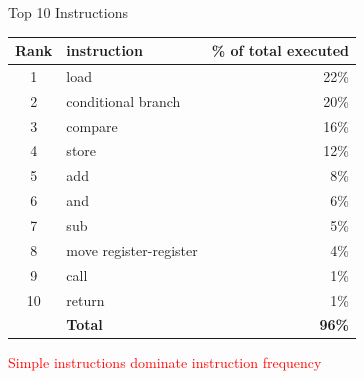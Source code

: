 \documentclass[aspectratio=169,12pt]{beamer}
\begin{document}
\begin{frame}{Top 10 Instructions}
\centering
\begin{table}
\begin{tabular}{clr}
\toprule
\textbf{Rank} & \textbf{instruction} & \textbf{\% of total executed} \\
\midrule
1 & load & 22\% \\
2 & conditional branch & 20\% \\
3 & compare & 16\% \\
4 & store & 12\% \\
5 & add & 8\% \\
6 & and & 6\% \\
7 & sub & 5\% \\
8 & move register-register & 4\% \\
9 & call & 1\% \\
10 & return & 1\% \\
\midrule
& \textbf{Total} & \textbf{96\%} \\
\bottomrule
\end{tabular}
\end{table}

\vspace{0.5cm}
\Large
\textcolor{red}{Simple instructions dominate instruction frequency}
\end{frame}
\end{document}
